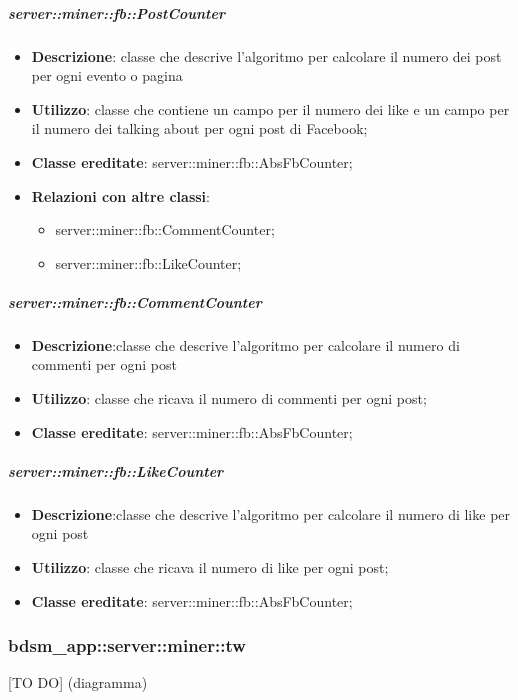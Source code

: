 	\subparagraph{server::miner::fb::PostCounter} %
		\label{subp:server_miner_fb_PostCounter}
			\begin{itemize}
				\item \textbf{Descrizione}: classe che descrive l'algoritmo per calcolare il numero dei post per ogni evento o pagina
				\item \textbf{Utilizzo}: classe che contiene un campo per il numero dei like e un campo per il numero dei talking about per ogni post di Facebook;
				\item \textbf{Classe ereditate}: server::miner::fb::AbsFbCounter;				
				\item \textbf{Relazioni con altre classi}:
					\begin{itemize}
						\item server::miner::fb::CommentCounter;
						\item server::miner::fb::LikeCounter;
					\end{itemize}
			\end{itemize}
	
	\subparagraph{server::miner::fb::CommentCounter} %
		\label{subp:server_miner_fb_CommentCounter}
			\begin{itemize}
				\item \textbf{Descrizione}:classe che descrive l'algoritmo per calcolare il numero di commenti per ogni post
				\item \textbf{Utilizzo}: classe che ricava il numero di commenti per ogni post;
				\item \textbf{Classe ereditate}: server::miner::fb::AbsFbCounter;
			\end{itemize}
	
	\subparagraph{server::miner::fb::LikeCounter} %
		\label{subp:server_miner_fb_LikeCounter}
			\begin{itemize}
					\item \textbf{Descrizione}:classe che descrive l'algoritmo per calcolare il numero di like per ogni post
				\item \textbf{Utilizzo}: classe che ricava il numero di like per ogni post;
				\item \textbf{Classe ereditate}: server::miner::fb::AbsFbCounter;
			\end{itemize}

\subsubsection{bdsm\_app::server::miner::tw} %
\label{ssub:bdsm_app_server_miner_tw}
[TO DO] (diagramma) \newline \newline

